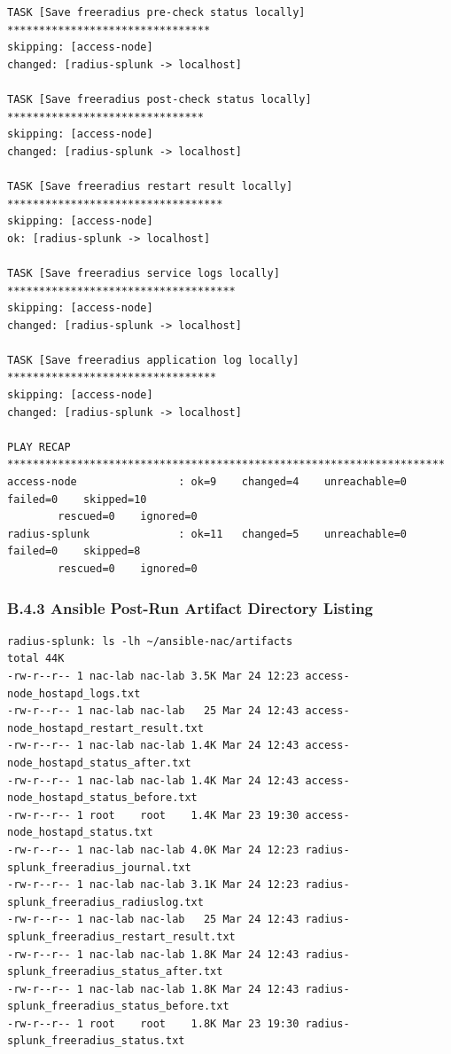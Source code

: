 \documentclass[11pt]{article}
\begin{document}
\begin{verbatim}
TASK [Save freeradius pre-check status locally] ********************************
skipping: [access-node]
changed: [radius-splunk -> localhost]

TASK [Save freeradius post-check status locally] *******************************
skipping: [access-node]
changed: [radius-splunk -> localhost]

TASK [Save freeradius restart result locally] **********************************
skipping: [access-node]
ok: [radius-splunk -> localhost]

TASK [Save freeradius service logs locally] ************************************
skipping: [access-node]
changed: [radius-splunk -> localhost]

TASK [Save freeradius application log locally] *********************************
skipping: [access-node]
changed: [radius-splunk -> localhost]

PLAY RECAP *********************************************************************
access-node                : ok=9    changed=4    unreachable=0    failed=0    skipped=10   
        rescued=0    ignored=0
radius-splunk              : ok=11   changed=5    unreachable=0    failed=0    skipped=8    
        rescued=0    ignored=0
\end{verbatim}


\subsubsection{B.4.3 Ansible Post-Run Artifact Directory Listing}
\label{sec:appendix-b-ansible-post-run-artifact-directory-listing}

\begin{verbatim}
radius-splunk: ls -lh ~/ansible-nac/artifacts
total 44K
-rw-r--r-- 1 nac-lab nac-lab 3.5K Mar 24 12:23 access-node_hostapd_logs.txt
-rw-r--r-- 1 nac-lab nac-lab   25 Mar 24 12:43 access-node_hostapd_restart_result.txt
-rw-r--r-- 1 nac-lab nac-lab 1.4K Mar 24 12:43 access-node_hostapd_status_after.txt
-rw-r--r-- 1 nac-lab nac-lab 1.4K Mar 24 12:43 access-node_hostapd_status_before.txt
-rw-r--r-- 1 root    root    1.4K Mar 23 19:30 access-node_hostapd_status.txt
-rw-r--r-- 1 nac-lab nac-lab 4.0K Mar 24 12:23 radius-splunk_freeradius_journal.txt
-rw-r--r-- 1 nac-lab nac-lab 3.1K Mar 24 12:23 radius-splunk_freeradius_radiuslog.txt
-rw-r--r-- 1 nac-lab nac-lab   25 Mar 24 12:43 radius-splunk_freeradius_restart_result.txt
-rw-r--r-- 1 nac-lab nac-lab 1.8K Mar 24 12:43 radius-splunk_freeradius_status_after.txt
-rw-r--r-- 1 nac-lab nac-lab 1.8K Mar 24 12:43 radius-splunk_freeradius_status_before.txt
-rw-r--r-- 1 root    root    1.8K Mar 23 19:30 radius-splunk_freeradius_status.txt
\end{verbatim}
\end{document}

